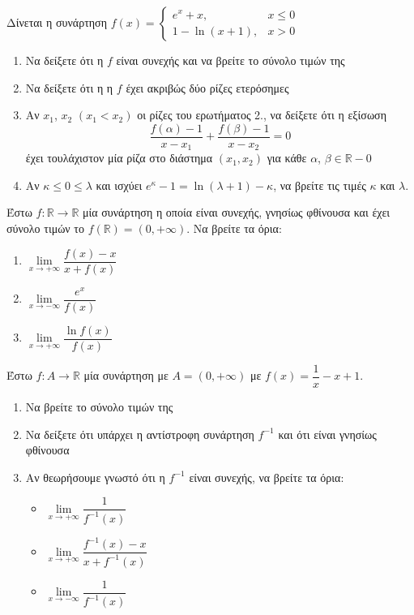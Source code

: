 \documentclass{presentation}
\begin{document}
\begin{askisi}
  Δίνεται η συνάρτηση $f(x)=\begin{cases}
      e^x+x,       & x\le 0 \\
      1-\ln (x+1), & x>0
    \end{cases}$
  \begin{enumerate}
    \item<1-> Να δείξετε ότι η $f$ είναι συνεχής και να βρείτε το σύνολο τιμών της
    \item<2-> Να δείξετε ότι η η $f$ έχει ακριβώς δύο ρίζες ετερόσημες
    \item<3-> Αν $x_1$, $x_2$ $(x_1<x_2)$ οι ρίζες του ερωτήματος 2., να δείξετε ότι η εξίσωση
          $$\frac{f(α)-1}{x-x_1}+\frac{f(β)-1}{x-x_2}=0$$
          έχει τουλάχιστον μία ρίζα στο διάστημα $(x_1,x_2)$ για κάθε $α$, $β\in\mathbb{R}-{0}$
    \item<4-> Αν $κ\le 0\le λ$ και ισχύει $e^κ-1=\ln (λ+1)-κ$, να βρείτε τις τιμές $κ$ και $λ$.
  \end{enumerate}
\end{askisi}

\begin{askisi}
  Έστω $f:\mathbb{R}\to\mathbb{R}$ μία συνάρτηση η οποία είναι συνεχής, γνησίως φθίνουσα και έχει σύνολο τιμών το $f(\mathbb{R})=(0,+\infty)$. Να βρείτε τα όρια:
  \begin{enumerate}
    \item<1-> $\lim\limits_{x \to +\infty}{ \dfrac{f(x)-x}{x+f(x)} }$
    \item<2-> $\lim\limits_{x \to -\infty}{ \dfrac{e^x}{f(x)} }$
    \item<3-> $\lim\limits_{x \to +\infty}{ \dfrac{\ln f(x)}{f(x)} }$
  \end{enumerate}
\end{askisi}

\begin{askisi}
  Έστω $f:Α\to\mathbb{R}$ μία συνάρτηση με $Α=(0,+\infty)$ με $f(x)=\dfrac{1}{x}-x+1$.
  \begin{enumerate}
    \item<1-> Να βρείτε το σύνολο τιμών της
    \item<2-> Να δείξετε ότι υπάρχει η αντίστροφη συνάρτηση $f^{-1}$ και ότι είναι γνησίως φθίνουσα
    \item<3-> Αν θεωρήσουμε γνωστό ότι η $f^{-1}$ είναι συνεχής, να βρείτε τα όρια:
          \begin{itemize}
            \item $\lim\limits_{x \to +\infty}{ \dfrac{1}{f^{-1}(x)} }$
            \item<4-> $\lim\limits_{x \to +\infty}{ \dfrac{f^{-1}(x)-x}{x+f^{-1}(x)} }$
            \item<5-> $\lim\limits_{x \to -\infty}{ \dfrac{1}{f^{-1}(x)} }$
          \end{itemize}
  \end{enumerate}
\end{askisi}
\end{document}
